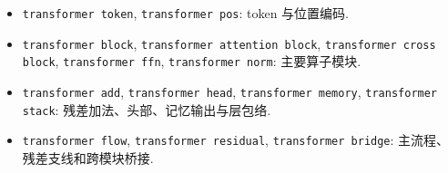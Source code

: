 \documentclass[a4paper,12pt,oneside]{maki-notes}
\begin{document}
\begin{styleinventory}
\begin{itemize}
\item \texttt{transformer token}, \texttt{transformer pos}: token 与位置编码.
\item \texttt{transformer block}, \texttt{transformer attention block}, \texttt{transformer cross block}, \texttt{transformer ffn}, \texttt{transformer norm}: 主要算子模块.
\item \texttt{transformer add}, \texttt{transformer head}, \texttt{transformer memory}, \texttt{transformer stack}: 残差加法、头部、记忆输出与层包络.
\item \texttt{transformer flow}, \texttt{transformer residual}, \texttt{transformer bridge}: 主流程、残差支线和跨模块桥接.
\end{itemize}
\end{styleinventory}
\end{document}
